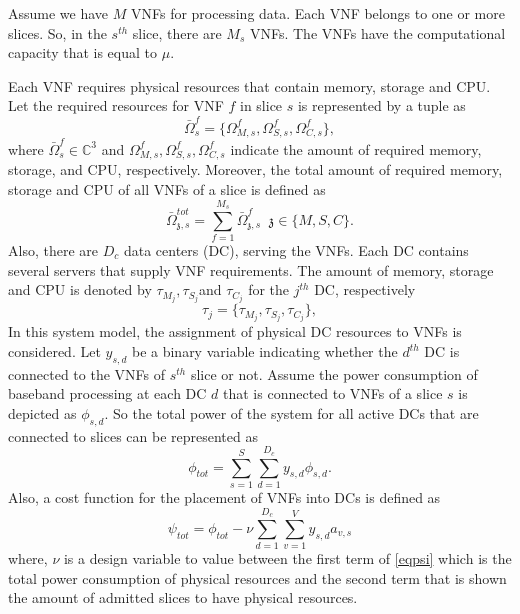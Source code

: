 \documentclass[conference]{IEEEtran}
\begin{document}
\begin{enumerate}
Assume we have $M$ VNFs for processing data.
Each VNF  belongs to one or more slices. So, in the $s^{th}$ slice, there are $M_{s}$ VNFs. The VNFs have the computational capacity that is  equal to $\mu$.


Each VNF requires
physical resources that contain memory, storage and CPU.
Let the required resources for VNF $f$ in slice $s$ is represented by a tuple as
\begin{equation}
\bar{\Omega}_{s}^f = \{\Omega_{M,{s}}^f, \Omega_{S,{s}}^f, \Omega_{C,{s}}^f \},
\end{equation}
where $\bar{\Omega}_{s}^f\in \mathbb{C}^{3}$ and $\Omega_{M,{s}}^f, \Omega_{S,{s}}^f, \Omega_{C,{s}}^f$ indicate the amount of required memory, storage, and CPU, respectively.
Moreover, the total amount of required memory, storage and CPU of all VNFs of a slice is defined as
\begin{equation}
\textstyle \bar{\Omega}_{\mathfrak{z},s}^{tot} = \sum_{f=1}^{M_s}\bar{\Omega}_{\mathfrak{z},s}^f \;\; \mathfrak{z} \in \{M, S, C\}.
\end{equation}
Also, there are $D_c$ data centers (DC), serving the VNFs. Each DC contains several servers that supply VNF requirements.
The amount of memory, storage and CPU is denoted by $\tau_{M_{j}}, \tau_{S_{j}}$and $\tau_{C_{j}} $ for the $j^{th}$ DC, respectively
\begin{equation*}
\tau_j = \{\tau_{M_{j}}, \tau_{S_{j}}, \tau_{C_{j}} \},
\end{equation*}
In this system model, the assignment of physical DC resources to VNFs is considered. Let $y_{s,d}$ be a binary variable indicating whether the $d^{th}$ DC is connected to the VNFs of $s^{th}$ slice or not.
Assume the power consumption of baseband processing at each DC $d$ that is connected to VNFs of a slice $s$ is depicted as
$\phi_{s,d}$. So the total power of the system for all active DCs that are connected to slices can be represented as
\begin{equation*}
\textstyle \phi_{tot} = \sum_{s=1}^{S}\sum_{d=1}^{D_c}y_{s,d}\phi_{s,d}.
\end{equation*}
Also, a cost function for the placement of VNFs into DCs is defined as
\begin{equation}\label{eqpsi}
\textstyle  \psi_{tot} = \phi_{tot} - \nu \sum_{d=1}^{D_c}\sum_{v=1}^{V}y_{s,d}a_{v,s}
\end{equation}
where, $\nu$ is a design variable to value between the first term of \eqref{eqpsi} which is the total power consumption of physical resources and the second term that is shown the amount of admitted slices to have physical resources.

\end{enumerate}
\end{document}
